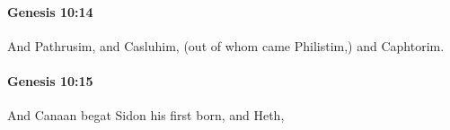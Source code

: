 		\paragraph{Genesis 10:14} %
			\label{GENESIS-10-14}

			And Pathrusim, and Casluhim, (out of whom came Philistim,) and Caphtorim.


		\paragraph{Genesis 10:15} %
			\label{GENESIS-10-15}

			And Canaan begat Sidon his first born, and Heth,


